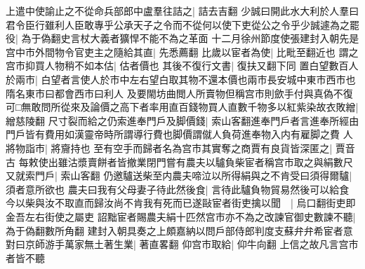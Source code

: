 上遣中使諭止之不從命兵部郎中盧羣往詰之|{
	詰去吉翻}
少誠曰開此水大利於人羣曰君令臣行雖利人臣敢專乎公承天子之令而不從何以使下吏從公之令乎少誠遽為之罷役|{
	為于偽翻史言杖大義者獷悍不能不為之革面}
十二月徐州節度使張建封入朝先是宫中市外間物令官吏主之隨給其直|{
	先悉薦翻}
比歲以宦者為使|{
	比毗至翻近也}
謂之宫市抑買人物稍不如本估|{
	估者價也}
其後不復行文書|{
	復扶又翻下同}
置白望數百人於兩市|{
	白望者言使人於市中左右望白取其物不還本價也兩市長安城中東市西市也隋名東市曰都會西市曰利人}
及要閙坊曲閲人所賣物但稱宫市則歛手付與真偽不復可□無敢問所從來及論價之高下者率用直百錢物買人直數千物多以紅紫染故衣敗繒|{
	繒慈陵翻}
尺寸裂而給之仍索進奉門戶及脚價錢|{
	索山客翻進奉門戶者言進奉所經由門戶皆有費用如漢靈帝時所謂導行費也脚價謂僦人負荷進奉物入内有雇脚之費}
人將物詣市|{
	將齎持也}
至有空手而歸者名為宫市其實奪之商賈有良貨皆深匿之|{
	賈音古}
每敕使出雖沽漿賣餅者皆撤業閉門嘗有農夫以驢負柴宦者稱宫市取之與絹數尺又就索門戶|{
	索山客翻}
仍邀驢送柴至内農夫啼泣以所得絹與之不肯受曰須得爾驢|{
	須者意所欲也}
農夫曰我有父母妻子待此然後食|{
	言待此驢負物貿易然後可以給食}
今以柴與汝不取直而歸汝尚不肯我有死而已遂敺宦者街吏擒以聞　|{
	烏口翻街吏即金吾左右街使之屬吏}
詔黜宦者賜農夫絹十匹然宫市亦不為之改諫官御史數諫不聽|{
	為于偽翻數所角翻}
建封入朝具奏之上頗嘉納以問戶部侍郎判度支蘇弁弁希宦者意對曰京師游手萬家無土著生業|{
	著直畧翻}
仰宫市取給|{
	仰牛向翻}
上信之故凡言宫市者皆不聽

